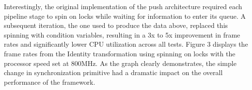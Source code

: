 Interestingly, the original implementation of the push architecture required each pipeline stage to
spin on locks while waiting for information to enter its queue.  A subsequent iteration, the
one used to produce the data above, replaced this spinning with condition variables, resulting
in a 3x to 5x improvement in frame rates and significantly lower CPU utilization across all tests.
Figure 3 displays the frame rates from the Identity transformation using spinning on locks with
the processor speed set at 800MHz.  As
the graph clearly demonstrates, the simple change in synchronization primitive had a dramatic impact on
the overall performance of the framework.
